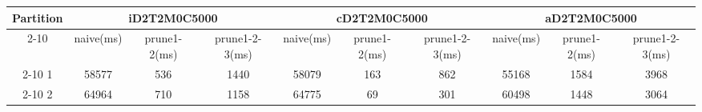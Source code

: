 \begin{table*}[t]
  \centering
\makeatletter
    \long{}
\makeatother
  \caption{2 partitions in Three Dimension}
    \vspace*{3pt}
  \footnotesize

  \label{table:partition4InThree}
  \begin{tabular}{|c||c|c|c|c|c|c|c|c|c|}
  \hline
  \multirow{2}{*}{Partition} &  \multicolumn{3}{|c|}{iD2T2M0C5000} & \multicolumn{3}{|c|}{cD2T2M0C5000} &\multicolumn{3}{|c|}{aD2T2M0C5000} \\\cline{2-10}
    &  naive(ms) & prune1-2(ms) & prune1-2-3(ms) & naive(ms) & prune1-2(ms) & prune1-2-3(ms) & naive(ms) & prune1-2(ms) & prune1-2-3(ms) \\\hline \hline

\cline{2-10}
    1 &  58577 & 536 & 1440 & 58079 & 163 & 862 & 55168 & 1584 & 3968 \\\hline

\cline{2-10}
    2 &  64964 & 710 & 1158 & 64775 & 69 & 301 & 60498 & 1448 & 3064 \\\hline
    
  \end{tabular}
  \vspace*{-17pt}
\end{table*}

